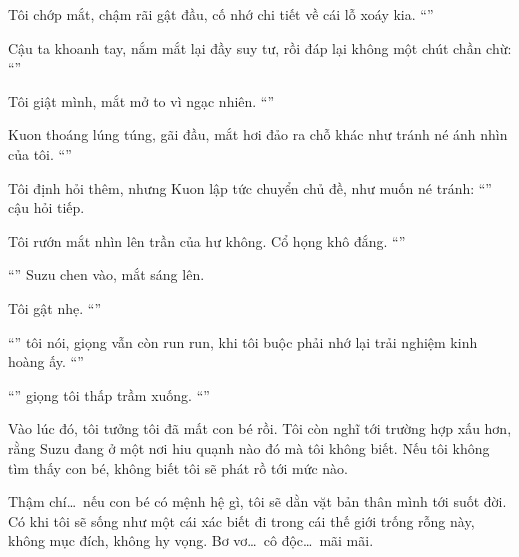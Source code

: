 \documentclass[../main.tex]{subfiles}
\begin{document}
Tôi chớp mắt, chậm rãi gật đầu, cố nhớ chi tiết về cái lỗ xoáy kia. ``''

Cậu ta khoanh tay, nắm mắt lại đầy suy tư, rồi đáp lại không một chút chần chừ: ``''

Tôi giật mình, mắt mở to vì ngạc nhiên. ``''

Kuon thoáng lúng túng, gãi đầu, mắt hơi đảo ra chỗ khác như tránh né ánh nhìn của tôi. ``''

Tôi định hỏi thêm, nhưng Kuon lập tức chuyển chủ đề, như muốn né tránh: ``'' cậu hỏi tiếp.

Tôi rướn mắt nhìn lên trần của hư không. Cổ họng khô đắng. ``''

``'' Suzu chen vào, mắt sáng lên.

Tôi gật nhẹ. ``''

``'' tôi nói, giọng vẫn còn run run, khi tôi buộc phải nhớ lại trải nghiệm kinh hoàng ấy. ``''

``'' giọng tôi thấp trầm xuống. ``''

Vào lúc đó, tôi tưởng tôi đã mất con bé rồi. Tôi còn nghĩ tới trường hợp xấu hơn, rằng Suzu đang ở một nơi hiu quạnh nào đó mà tôi không biết. Nếu tôi không tìm thấy con bé, không biết tôi sẽ phát rồ tới mức nào.

Thậm chí\dots\ nếu con bé có mệnh hệ gì, tôi sẽ dằn vặt bản thân mình tới suốt đời. Có khi tôi sẽ sống như một cái xác biết đi trong cái thế giới trống rỗng này, không mục đích, không hy vọng. Bơ vơ\dots\ cô độc\dots\ mãi mãi.
\end{document}
